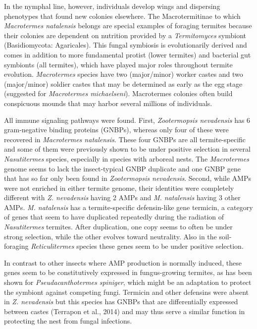\documentclass[11pt]{article}
\begin{document}
\begin{sloppypar}
In the nymphal line, however, individuals develop wings and dispersing phenotypes that found new colonies elsewhere. 
The Macrotermitinae to which \textit{Macrotermes natalensis} belongs are special examples of foraging termites because their colonies are dependent on nutrition provided by a \textit{Termitomyces} symbiont (Basidiomycota: Agaricales). 
This fungal symbiosis is evolutionarily derived and comes in addition to more fundamental protist (lower termites) and bacterial gut symbionts (all termites), which have played major roles throughout termite evolution. 
\textit{Macrotermes} species have two (major/minor) worker castes and two (major/minor) soldier castes that may be determined as early as the egg stage (suggested for \textit{Macrotermes michaelseni}). 
Macrotermes colonies often build conspicuous mounds that may harbor several millions of individuals.
\par
All immune signaling pathways were found. 
First, \textit{Zootermopsis nevadensis} has 6 gram-negative binding proteins (GNBPs), whereas only four of these were recovered in \textit{Macrotermes natalensis}. 
These four GNBPs are all termite-specific and some of them were previously shown to be under positive selection in several \textit{Nasutitermes} species, especially in species with arboreal nests. 
The \textit{Macrotermes} genome seems to lack the insect-typical GNBP duplicate and one GNBP gene that has so far only been found in \textit{Zootermopsis nevadensis}. 
Second, while AMPs were not enriched in either termite genome, their identities were completely different with \textit{Z. nevadensis} having 2 AMPs and \textit{M. natalensis} having 3 other AMPs. 
\textit{M. natalensis} has a termite-specific defensin-like gene termicin, a category of genes that seem to have duplicated repeatedly during the radiation of \textit{Nasutitermes} termites. 
After duplication, one copy seems to often be under strong selection, while the other evolves toward neutrality. 
Also in the soil-foraging \textit{Reticulitermes} species these genes seem to be under positive selection.
\par
In contrast to other insects where AMP production is normally induced, these genes seem to be constitutively expressed in fungus-growing termites, as has been shown for \textit{Pseudacanthotermes spiniger}, which might be an adaptation to protect the symbiont against competing fungi. 
Termicin and other defensins were absent in \textit{Z. nevadensis} but this species has GNBPs that are differentially expressed between castes (Terrapon et al., 2014) and may thus serve a similar function in protecting the nest from fungal infections. 

\end{sloppypar}
\end{document}
